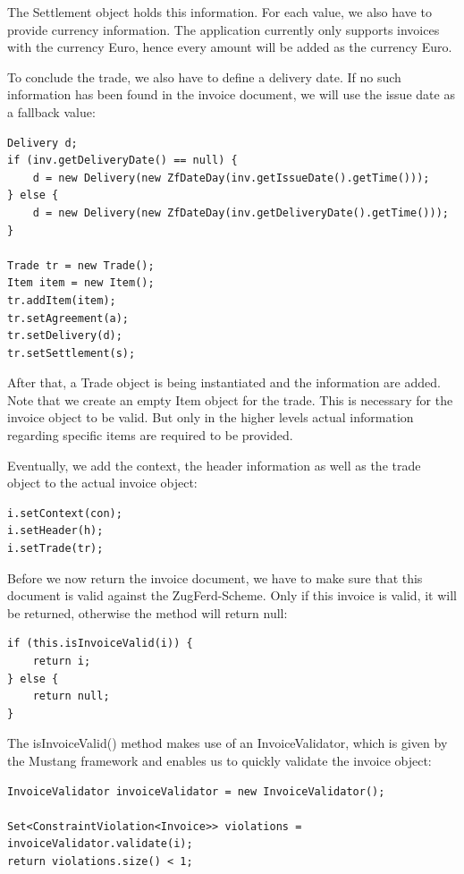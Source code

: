 The Settlement object holds this information. For each value, we also have to provide currency information. The application currently only supports invoices with the currency Euro, hence every amount will be added as the currency Euro.

To conclude the trade, we also have to define a delivery date. If no such information has been found in the invoice document, we will use the issue date as a fallback value:

\begin{lstlisting}[caption={Population of the trade object}]
Delivery d;
if (inv.getDeliveryDate() == null) {
    d = new Delivery(new ZfDateDay(inv.getIssueDate().getTime()));
} else {
    d = new Delivery(new ZfDateDay(inv.getDeliveryDate().getTime()));
}

Trade tr = new Trade();
Item item = new Item();
tr.addItem(item);
tr.setAgreement(a);
tr.setDelivery(d);
tr.setSettlement(s);
\end{lstlisting}

After that, a Trade object is being instantiated and the information are added. Note that we create an empty Item object for the trade. This is necessary for the invoice object to be valid. But only in the higher levels actual information regarding specific items are required to be provided.

Eventually, we add the context, the header information as well as the trade object to the actual invoice object:

\begin{lstlisting}[caption={Population of the invoice object}]
i.setContext(con);
i.setHeader(h);
i.setTrade(tr);
\end{lstlisting}

Before we now return the invoice document, we have to make sure that this document is valid against the ZugFerd-Scheme. Only if this invoice is valid, it will be returned, otherwise the method will return null:

\begin{lstlisting}[caption={Validation of the invoice object}]
if (this.isInvoiceValid(i)) {
    return i;
} else {
    return null;
}
\end{lstlisting}

The isInvoiceValid() method makes use of an InvoiceValidator, which is given by the Mustang framework and enables us to quickly validate the invoice object:

\begin{lstlisting}[caption={Usage of the InvoiceValidator object}]
InvoiceValidator invoiceValidator = new InvoiceValidator();

Set<ConstraintViolation<Invoice>> violations = invoiceValidator.validate(i);
return violations.size() < 1;
\end{lstlisting}

